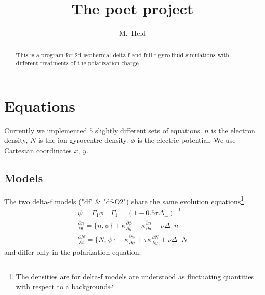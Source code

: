





\title{The poet project}
\author{M.~Held}
\maketitle

\begin{abstract}
  This is a program for 2d isothermal delta-f and full-f gyro-fluid simulations with different treatments of the polarization charge
\end{abstract}

\section{Equations}
Currently we implemented $5$ slightly different sets of equations. $n$ is the electron density, $N$ is the ion gyrocentre density. $\phi$ is the electric potential. We
use Cartesian coordinates $x$, $y$.
\subsection{Models}


The two delta-f models ("df" \& "df-O2") share the same evolution equations\footnote{The densities are for delta-f models are understood as fluctuating quantities with respect to a background} 
\begin{subequations}
\begin{align}
\psi = \Gamma_1 \phi \quad \Gamma_1 = ( 1- 0.5\tau\Delta_{\perp})^{-1} \\
 \frac{\partial n}{\partial t}     = 
    \{ n, \phi\} 
  + \kappa \frac{\partial \phi}{\partial y} 
  -\kappa \frac{\partial n}{\partial y}
  + \nu \Delta_{\perp} n  \\
  \frac{\partial N}{\partial t} =
  \{ N, \psi\} 
  + \kappa \frac{\partial \psi}{\partial y} 
  + \tau \kappa\frac{\partial N}{\partial y} +\nu\Delta_{\perp}N
\end{align}
\end{subequations}
and differ only in the polarization equation:\\

